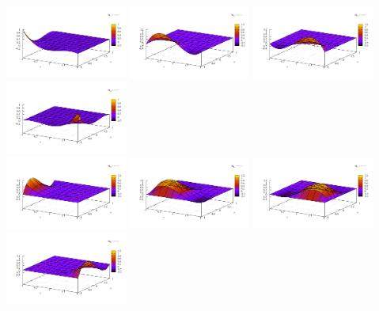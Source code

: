 \begin{center}
\includegraphics[width=4cm]{images/basis_Q3_2D/N1}
\includegraphics[width=4cm]{images/basis_Q3_2D/N2}
\includegraphics[width=4cm]{images/basis_Q3_2D/N3}
\includegraphics[width=4cm]{images/basis_Q3_2D/N4}\\
\includegraphics[width=4cm]{images/basis_Q3_2D/N5}
\includegraphics[width=4cm]{images/basis_Q3_2D/N6}
\includegraphics[width=4cm]{images/basis_Q3_2D/N7}
\includegraphics[width=4cm]{images/basis_Q3_2D/N8}\\

\end{center}

